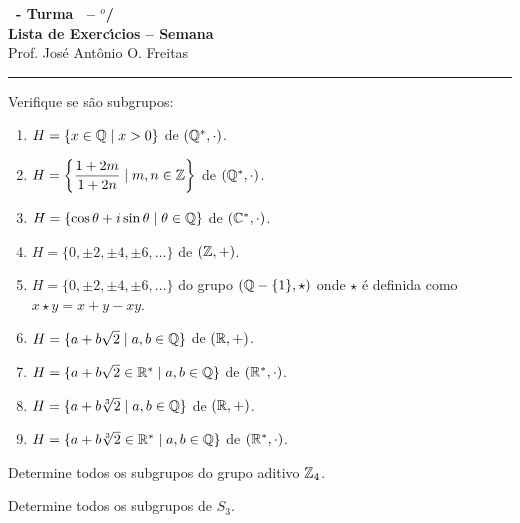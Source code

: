 \documentclass[12pt]{exam}
\begin{document}
\begin{center}
    
    {\Large\bf \disciplina\ - Turma \turma\ -- \semestre$^{o}$/\ano} \\ \vspace{9pt} {\large\bf
        Lista de Exerc{\'\i}cios -- Semana \numerosemana}\\ \vspace{9pt} Prof. Jos{\'e} Ant{\^o}nio O. Freitas
    \end{center}
    \hrule

    \vspace{.6cm}
    
    \questao{} Verifique se s\~ao subgrupos:
    \begin{enumerate}[label=({\alph*})]
      \item $H = \{x \in \mathbb{Q} \mid x > 0\}$ de $(\mathbb{Q}^*,\cdot)$.
      \item $H = \left\{\dfrac{1 + 2m}{1 + 2n} \mid m, n \in \mathbb{Z}\right\}$ de $(\mathbb{Q}^*,\cdot)$.
      \item $H = \{\cos\theta + i\sin\theta \mid \theta \in \mathbb{Q}\}$ de $(\mathbb{C}^*,\cdot)$.
      \item $H = \{0, \pm 2, \pm 4, \pm 6, \dots\}$ de $(\mathbb{Z},+)$.
      \item $H = \{0, \pm 2, \pm 4, \pm 6, \dots\}$ do grupo $(\mathbb{Q} - \{1\},\star)$ onde $\star$ \'e definida como $x \star y = x + y - xy$.
      \item $H = \{a + b\sqrt{2} \mid a, b \in \mathbb{Q}\}$ de $(\mathbb{R},+)$.
      \item $H = \{a + b\sqrt{2} \in \mathbb{R}^* \mid a, b \in \mathbb{Q}\}$ de $(\mathbb{R}^*,\cdot)$.
      \item $H = \{a + b\sqrt[3]{2} \mid a, b \in \mathbb{Q}\}$ de $(\mathbb{R},+)$.
      \item $H = \{a + b\sqrt[3]{2} \in \mathbb{R}^* \mid a, b \in \mathbb{Q}\}$ de $(\mathbb{R}^*,\cdot)$.
    \end{enumerate}

    \vspace{.3cm}

    \questao{} Determine todos os subgrupos do grupo aditivo $\mathbb{Z}_4$.

    \vspace{.3cm}

    \questao{} Determine todos os subgrupos de $S_3$.

    \vspace{.3cm}
\end{document}
